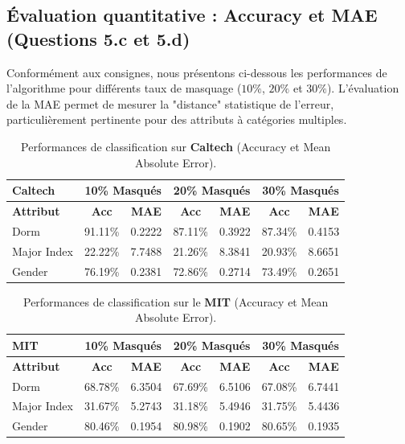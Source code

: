 \documentclass[a4paper,11pt]{article}
\begin{document}
\subsection{Évaluation quantitative : Accuracy et MAE (Questions 5.c et 5.d)}
Conformément aux consignes, nous présentons ci-dessous les performances de l'algorithme pour différents taux de masquage ($10\%$, $20\%$ et $30\%$). L'évaluation de la MAE permet de mesurer la "distance" statistique de l'erreur, particulièrement pertinente pour des attributs à catégories multiples.

\begin{table}[H]
    \centering
    \small
    \begin{tabular}{|l|cc|cc|cc|}
        \hline
        \textbf{Caltech} & \multicolumn{2}{c|}{\textbf{10\% Masqués}} & \multicolumn{2}{c|}{\textbf{20\% Masqués}} & \multicolumn{2}{c|}{\textbf{30\% Masqués}} \\
        \hline
        \textbf{Attribut} & \textbf{Acc} & \textbf{MAE} & \textbf{Acc} & \textbf{MAE} & \textbf{Acc} & \textbf{MAE} \\
        \hline
        Dorm & 91.11\% & 0.2222 & 87.11\% & 0.3922 & 87.34\% & 0.4153 \\
        Major Index & 22.22\% & 7.7488 & 21.26\% & 8.3841 & 20.93\% & 8.6651 \\
        Gender & 76.19\% & 0.2381 & 72.86\% & 0.2714 & 73.49\% & 0.2651 \\
        \hline
    \end{tabular}
    \caption{Performances de classification sur \textbf{Caltech} (Accuracy et Mean Absolute Error).}
    \label{tab:q5_caltech}
\end{table}

\begin{table}[H]
    \centering
    \small
    \begin{tabular}{|l|cc|cc|cc|}
        \hline
        \textbf{MIT} & \multicolumn{2}{c|}{\textbf{10\% Masqués}} & \multicolumn{2}{c|}{\textbf{20\% Masqués}} & \multicolumn{2}{c|}{\textbf{30\% Masqués}} \\
        \hline
        \textbf{Attribut} & \textbf{Acc} & \textbf{MAE} & \textbf{Acc} & \textbf{MAE} & \textbf{Acc} & \textbf{MAE} \\
        \hline
        Dorm & 68.78\% & 6.3504 & 67.69\% & 6.5106 & 67.08\% & 6.7441 \\
        Major Index & 31.67\% & 5.2743 & 31.18\% & 5.4946 & 31.75\% & 5.4436 \\
        Gender & 80.46\% & 0.1954 & 80.98\% & 0.1902 & 80.65\% & 0.1935 \\
        \hline
    \end{tabular}
    \caption{Performances de classification sur le \textbf{MIT} (Accuracy et Mean Absolute Error).}
    \label{tab:q5_mit}
\end{table}
\end{document}
